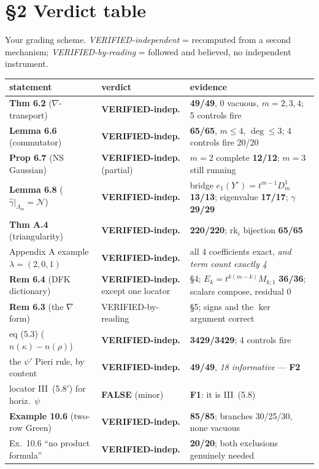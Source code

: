 \documentclass[11pt]{article}
\newcommand{\N}{\mathcal N}
\newcommand{\Lam}{\Lambda}
\begin{document}
\section*{\S2 Verdict table}
Your grading scheme. \emph{VERIFIED-independent} = recomputed from a second mechanism;
\emph{VERIFIED-by-reading} = followed and believed, no independent instrument.

\begin{longtable}{@{}p{}p{}p{}@{}}
\toprule
statement & verdict & evidence\\
\midrule
\endhead
\textbf{Thm 6.2} ($\nabla$-transport) & \textbf{VERIFIED-indep.} & \textbf{49/49}, 0 vacuous, $m=2,3,4$; 5 controls fire\\
\textbf{Lemma 6.6} (commutator) & \textbf{VERIFIED-indep.} & \textbf{65/65}, $m\le4$, $\deg\le3$; 4 controls fire 20/20\\
\textbf{Prop 6.7} (NS Gaussian) & \textbf{VERIFIED-indep.} (partial) & $m=2$ complete \textbf{12/12}; $m=3$ still running\\
\textbf{Lemma 6.8} ($\widehat\gamma|_{\Lam_m}=\N$) & \textbf{VERIFIED-indep.} & bridge $e_1(Y^\circ)=t^{m-1}D^1_m$ \textbf{13/13}; eigenvalue \textbf{17/17}; $\gamma$ \textbf{29/29}\\
\textbf{Thm A.4} (triangularity) & \textbf{VERIFIED-indep.} & \textbf{220/220}; $\mathrm{rk}_i$ bijection \textbf{65/65}\\
Appendix A example $\lambda=(2,0,1)$ & \textbf{VERIFIED-indep.} & all 4 coefficients exact, \emph{and term count exactly 4}\\
\textbf{Rem 6.4} (DFK dictionary) & \textbf{VERIFIED-indep.} except one locator & \S4; $E_k=t^{k(m-k)}M_{k;1}$ \textbf{36/36}; scalars compose, residual 0\\
\textbf{Rem 6.3} (the $\nabla$ form) & VERIFIED-by-reading & \S5; signs and the $\ker$ argument correct\\
eq (5.3) ($n(\kappa)-n(\rho)$) & \textbf{VERIFIED-indep.} & \textbf{3429/3429}; 4 controls fire\\
the $\psi'$ Pieri rule, by content & \textbf{VERIFIED-indep.} & \textbf{49/49}, \emph{18 informative} --- \textbf{F2}\\
locator III~(5.8$'$) for horiz.\ $\psi$ & \textbf{FALSE} (minor) & \textbf{F1}: it is III~(5.8)\\
\textbf{Example 10.6} (two-row Green) & \textbf{VERIFIED-indep.} & \textbf{85/85}; branches 30/25/30, none vacuous\\
Ex.\ 10.6 ``no product formula'' & \textbf{VERIFIED-indep.} & \textbf{20/20}; both exclusions genuinely needed\\

\end{longtable}
\end{document}
